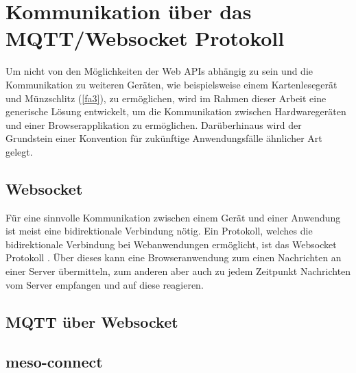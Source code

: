 \section{Kommunikation über das MQTT/Websocket Protokoll}
\label{sec:mqtt-websocket}

Um nicht von den Möglichkeiten der Web APIs abhängig zu sein und die Kommunikation
zu weiteren Geräten, wie beispielsweise einem Kartenlesegerät und Münzschlitz (\ref{fa3}),
zu ermöglichen, wird im Rahmen dieser
Arbeit eine generische Lösung entwickelt, um die Kommunikation zwischen Hardwaregeräten
und einer Browserapplikation zu ermöglichen. Darüberhinaus wird der Grundstein 
einer Konvention für zukünftige Anwendungsfälle ähnlicher Art gelegt.\\

\subsection{Websocket}
Für eine sinnvolle Kommunikation zwischen einem Gerät und einer Anwendung ist meist
eine bidirektionale Verbindung nötig. Ein Protokoll, welches die bidirektionale Verbindung
bei Webanwendungen ermöglicht, ist das Websocket Protokoll \cite{rfc-websocket}. Über dieses
kann eine Browseranwendung zum einen Nachrichten an einer Server übermitteln, zum anderen 
aber auch zu jedem Zeitpunkt Nachrichten vom Server empfangen und auf diese reagieren.

\subsection{MQTT über Websocket}
\subsection{meso-connect}
